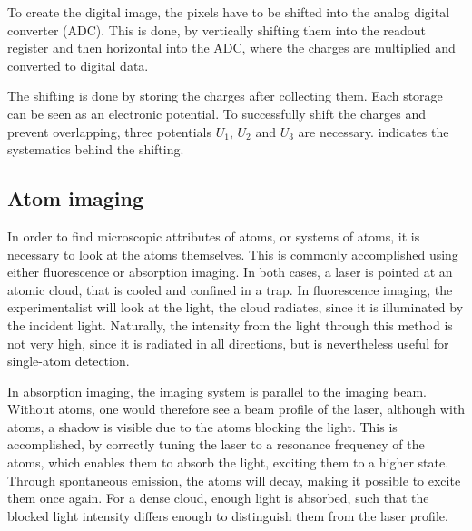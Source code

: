	To create the digital image, the pixels have to be shifted into the analog digital converter (ADC). This is done, by vertically shifting them into the readout register and then horizontal into the ADC, where the charges are multiplied and converted to digital data.
	
	
	The shifting is done by storing the charges after collecting them. Each storage can be seen as an electronic potential. To successfully shift the charges and prevent overlapping, three potentials $U_1$, $U_2$ and $U_3$ are necessary.  indicates the systematics behind the shifting.
	
	
\subsection{Atom imaging} 
In order to find microscopic attributes of atoms, or systems of atoms, it is necessary to look at the atoms themselves. This is commonly accomplished using either fluorescence or absorption imaging. In both cases, a laser is pointed at an atomic cloud, that is cooled and confined in a trap. In fluorescence imaging, the experimentalist will look at the light, the cloud radiates, since it is illuminated by the incident light.
Naturally, the intensity from the light through this method is not very high, since it is radiated in all directions, but is nevertheless useful for single-atom detection.

In absorption imaging, the imaging system is parallel to the imaging beam. Without atoms, one would therefore see a beam profile of the laser, although with atoms, a shadow is visible due to the atoms blocking the light. This is accomplished, by correctly tuning the laser to a resonance frequency of the atoms, which enables them to absorb the light, exciting them to a higher state. Through spontaneous emission, the atoms will decay, making it possible to excite them once again. For a dense cloud, enough light is absorbed, such that the blocked light intensity differs enough to distinguish them from the laser profile.

